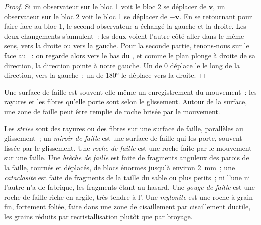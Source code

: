 \begin{proof}
Si un observateur sur le bloc 1 voit le bloc 2 se déplacer de $\mathbf v$, un observateur sur
le bloc 2 voit le bloc 1 se déplacer de $-\mathbf v$. En se retournant pour faire face au bloc 1, le
second observateur a échangé la gauche et la droite. Les deux changements s'annulent~: les deux
voient l'autre côté aller dans le même sens, vers la droite ou vers la gauche. Pour la
seconde partie, tenons-nous sur le  face au ~: on regarde alors
vers le bas du , et comme le plan plonge à droite de sa direction,
la direction pointe à notre gauche. Un  de $0$ déplace le 
le long de la direction, vers la gauche~; un  de \ang{180} le déplace vers la droite.
\end{proof}

Une surface de faille est souvent elle-même un enregistrement du mouvement~: les rayures et les
fibres qu'elle porte sont selon le glissement. Autour de la surface, une zone de faille peut être remplie
de roche brisée par le mouvement.

\begin{definition}\label{def:b1:faults-folds-fabrics:fault-rocks}
Les \emph{stries} sont des rayures ou des fibres sur une surface de
faille, parallèles au glissement~; un \emph{miroir de faille} est une
surface de faille qui les porte, souvent lissée par le glissement. Une \emph{roche
de faille} est une roche faite par le mouvement sur une faille. Une
\emph{brèche de faille} est faite de fragments anguleux des
parois de la faille, tournés et déplacés, de blocs énormes jusqu'à
environ \qty{2}{mm}~; une \emph{cataclasite} est faite de
fragments de la taille du sable ou plus petits~; ni l'une ni l'autre n'a de fabrique, les fragments étant
au hasard. Une \emph{gouge de faille} est une roche de faille riche en
argile, très tendre à l'. Une \emph{mylonite} est une
roche à grain fin, fortement foliée, faite dans une zone de cisaillement par cisaillement ductile,
les grains réduits par recristallisation plutôt que par broyage.
\end{definition}

